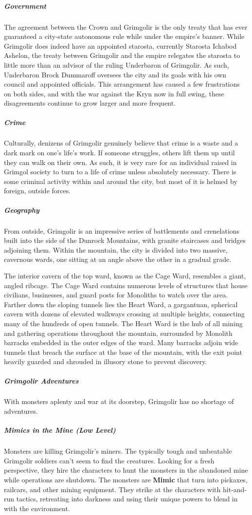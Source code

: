 \documentclass[10pt,a4paper,twoside,bg=print,twocolumn,openany,nodeprecatedcode]{dndbook}
\begin{document}
\subparagraph{Government}
The agreement between the Crown and Grimgolir is the only treaty that has ever guaranteed a city-state autonomous rule while under the empire's banner. While Grimgolir does indeed have an appointed starosta, currently Starosta Ichabod Ashelon, the treaty between Grimgolir and the empire relegates the starosta to little more than an advisor of the ruling Underbaron of Grimgolir. As such, Underbaron Brock Dummaroff oversees the city and its goals with his own council and appointed officials. This arrangement has caused a few frustrations on both sides, and with the war against the Kryn now in full swing, these disagreements continue to grow larger and more frequent.

\subparagraph{Crime}
Culturally, denizens of Grimgolir genuinely believe that crime is a waste and a dark mark on one's life's work. If someone struggles, others lift them up until they can walk on their own. As such, it is very rare for an individual raised in Grimgol society to turn to a life of crime unless absolutely necessary. There is some criminal activity within and around the city, but most of it is helmed by foreign, outside forces.

\subparagraph{Geography}
From outside, Grimgolir is an impressive series of battlements and crenelations built into the side of the Dunrock Mountains, with granite staircases and bridges adjoining them. Within the mountain, the city is divided into two massive, cavernous wards, one sitting at an angle above the other in a gradual grade.

The interior cavern of the top ward, known as the Cage Ward, resembles a giant, angled ribcage. The Cage Ward contains numerous levels of structures that house civilians, businesses, and guard posts for Monoliths to watch over the area. Farther down the sloping tunnels lies the Heart Ward, a gargantuan, spherical cavern with dozens of elevated walkways crossing at multiple heights, connecting many of the hundreds of open tunnels. The Heart Ward is the hub of all mining and gathering operations throughout the mountain, surrounded by Monolith barracks embedded in the outer edges of the ward. Many barracks adjoin wide tunnels that breach the surface at the base of the mountain, with the exit point heavily guarded and shrouded in illusory stone to prevent discovery.

\subparagraph{Grimgolir Adventures}
With monsters aplenty and war at its doorstep, Grimgolir has no shortage of adventures.

\subparagraph{Mimics in the Mine (Low Level)}
Monsters are killing Grimgolir's miners. The typically tough and unbeatable Grimgolir soldiers can't seem to find the creatures. Looking for a fresh perspective, they hire the characters to hunt the monsters in the abandoned mine while operations are shutdown. The monsters are \textbf{Mimic} that turn into pickaxes, railcars, and other mining equipment. They strike at the characters with hit-and-run tactics, retreating into darkness and using their unique powers to blend in with the environment.
\end{document}
